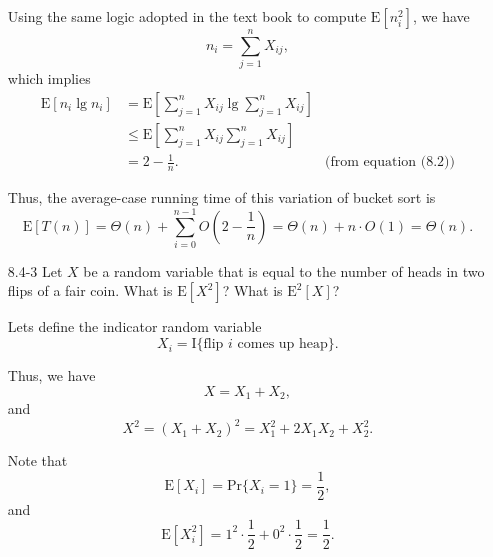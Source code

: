 \documentclass{report}
\makeatletter
\renewenvironment{framed}{%
 \def\FrameCommand##1{\hskip\@totalleftmargin
 \fboxsep=\FrameSep\fbox{##1}}%
 \MakeFramed {\advance\hsize-\width
   \@totalleftmargin\z@ \linewidth\hsize
   \@setminipage}}%
 {\par\unskip\endMakeFramed}
\makeatother
\begin{document}
\begin{enumerate}
\begin{framed}
Using the same logic adopted in the text book to compute $\text{E}[n_i^2]$, we
have
\[
  n_i = \sum_{j = 1}^{n} X_{ij},
\]
which implies
\begin{equation*}
\begin{aligned}
  \text{E}[n_i \lg n_i] &=   \text{E}\left[ \sum_{j = 1}^{n} X_{ij} \lg \sum_{j = 1}^{n} X_{ij} \right]\\
                        &\le \text{E}\left[ \sum_{j = 1}^{n} X_{ij} \sum_{j = 1}^{n} X_{ij} \right]\\
                        &=   2 - \frac{1}{n}. & \text{(from equation (8.2))}
\end{aligned}
\end{equation*}

Thus, the average-case running time of this variation of bucket sort is
\[
  \text{E}[T(n)] = \Theta(n) + \sum_{i = 0}^{n - 1} O\left(2 - \frac{1}{n}\right)
                 = \Theta(n) + n \cdot O\left(1\right)
                 = \Theta(n).
\]
\end{framed}

\newpage

\item[8.4-3]{Let $X$ be a random variable that is equal to the number of heads
in two flips of a fair coin. What is $\text{E}[X^2]$? What is $\text{E}^2[X]$?}

\begin{framed}
Lets define the indicator random variable
\[
  X_i = \text{I}\{\text{flip } i \text{ comes up heap}\}.
\]

Thus, we have
\[
  X = X_1 + X_2,
\]
and
\[
  X^2 = (X_1 + X_2)^2 = X_1^2 + 2 X_1 X_2 + X_2^2.
\]

Note that
\[
  \text{E}[X_i] = \text{Pr}\{X_i = 1\} = \frac{1}{2},
\]
and
\[
  \text{E}[X_i^2] = 1^2 \cdot \frac{1}{2} + 0^2 \cdot \frac{1}{2} = \frac{1}{2}.
\]


\end{framed}
\end{enumerate}
\end{document}
